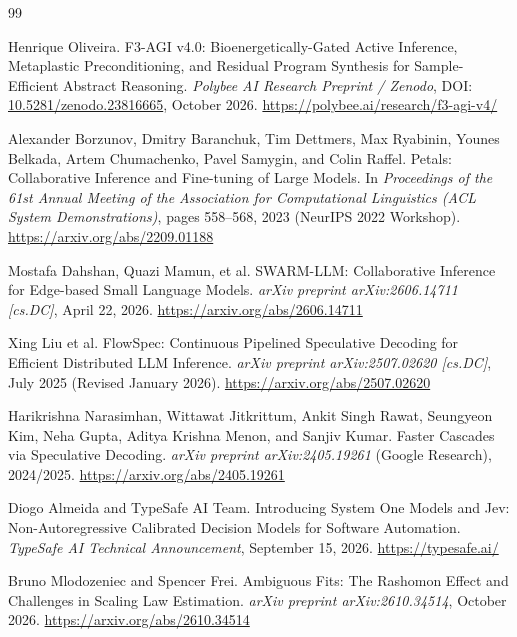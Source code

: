 \documentclass[10pt,a4paper]{article}
\begin{document}
\begin{thebibliography}{99}
\small

Henrique Oliveira.
\newblock F3-AGI v4.0: Bioenergetically-Gated Active Inference, Metaplastic Preconditioning, and Residual Program Synthesis for Sample-Efficient Abstract Reasoning.
\newblock \emph{Polybee AI Research Preprint / Zenodo}, DOI: \href{https://doi.org/10.5281/zenodo.23816665}{10.5281/zenodo.23816665}, October 2026. \url{https://polybee.ai/research/f3-agi-v4/}

Alexander Borzunov, Dmitry Baranchuk, Tim Dettmers, Max Ryabinin, Younes Belkada, Artem Chumachenko, Pavel Samygin, and Colin Raffel.
\newblock Petals: Collaborative Inference and Fine-tuning of Large Models.
\newblock In \emph{Proceedings of the 61st Annual Meeting of the Association for Computational Linguistics (ACL System Demonstrations)}, pages 558--568, 2023 (NeurIPS 2022 Workshop). \url{https://arxiv.org/abs/2209.01188}

Mostafa Dahshan, Quazi Mamun, et al.
\newblock SWARM-LLM: Collaborative Inference for Edge-based Small Language Models.
\newblock \emph{arXiv preprint arXiv:2606.14711 [cs.DC]}, April 22, 2026. \url{https://arxiv.org/abs/2606.14711}

Xing Liu et al.
\newblock FlowSpec: Continuous Pipelined Speculative Decoding for Efficient Distributed LLM Inference.
\newblock \emph{arXiv preprint arXiv:2507.02620 [cs.DC]}, July 2025 (Revised January 2026). \url{https://arxiv.org/abs/2507.02620}

Harikrishna Narasimhan, Wittawat Jitkrittum, Ankit Singh Rawat, Seungyeon Kim, Neha Gupta, Aditya Krishna Menon, and Sanjiv Kumar.
\newblock Faster Cascades via Speculative Decoding.
\newblock \emph{arXiv preprint arXiv:2405.19261} (Google Research), 2024/2025. \url{https://arxiv.org/abs/2405.19261}

Diogo Almeida and TypeSafe AI Team.
\newblock Introducing System One Models and Jev: Non-Autoregressive Calibrated Decision Models for Software Automation.
\newblock \emph{TypeSafe AI Technical Announcement}, September 15, 2026. \url{https://typesafe.ai/}

Bruno Mlodozeniec and Spencer Frei.
\newblock Ambiguous Fits: The Rashomon Effect and Challenges in Scaling Law Estimation.
\newblock \emph{arXiv preprint arXiv:2610.34514}, October 2026. \url{https://arxiv.org/abs/2610.34514}


\end{thebibliography}
\end{document}
